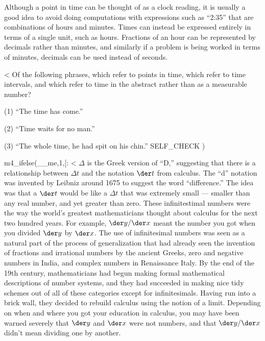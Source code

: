 Although a point in time can be thought of as a clock
reading, it is usually a good idea to avoid doing computations
with expressions such as ``2:35'' that are combinations of
hours and minutes. Times can instead be expressed entirely
in terms of a single unit, such as hours. Fractions of an
hour can be represented by decimals rather than minutes, and
similarly if a problem is being worked in terms of minutes,
decimals can be used instead of seconds.

<%
Of the following phrases, which refer to points in time,
which refer to time intervals, and which refer to time in
the abstract rather than as a measurable number?

(1) ``The time has come.''

(2) ``Time waits for no man.''

(3) ``The whole time, he had spit on his chin.''
  SELF_CHECK
  ) %

m4_ifelse(__me,1,[:
    <%
$\Delta$ is the Greek version of ``D,'' suggesting that there is a
relationship between $\Delta t$ and the notation $\der t$ from calculus.
The ``d'' notation was invented by Leibniz around 1675 to suggest the word ``difference.''
The idea was that a $\der t$ would be like a $\Delta t$ that was extremely small --- smaller than any real number, and
yet greater than zero. These infinitestimal numbers
were the way the world's greatest mathematicians thought about calculus for the next two hundred
years. For example, $\der y/\der x$ meant the number you got when you divided $\der y$ by $\der x$.
The use of infinitesimal numbers was seen as a natural part of the process of generalization that had
already seen the invention of fractions and irrational numbers by the ancient Greeks,
zero and negative numbers in India, and complex numbers in Renaissance Italy.
By the end of the 19th century, mathematicians had begun making formal mathematical descriptions of number systems,
and they had succeeded in making nice tidy schemes out of all of these categories except for infinitesimals.
Having run into a brick wall, they decided to rebuild calculus using the notion of a limit. Depending on when and
where you got your education in calculus, you may have been warned severely that $\der y$ and $\der x$ were not
numbers, and that $\der y/\der x$ didn't mean dividing one by another.

